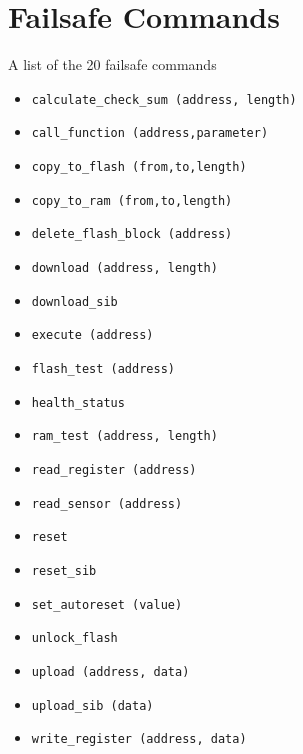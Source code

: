 \chapter{Failsafe Commands}
\label{appendix:B}
A list of the 20 failsafe commands
\begin{itemize}
	\item \texttt{calculate\_check\_sum (address, length)}
	\item \texttt{call\_function (address,parameter)}
	\item \texttt{copy\_to\_flash (from,to,length)}
	\item \texttt{copy\_to\_ram (from,to,length)}
	\item \texttt{delete\_flash\_block (address)}
	\item \texttt{download (address, length)}
	\item \texttt{download\_sib}
	\item \texttt{execute (address)}
	\item \texttt{flash\_test (address)}
	\item \texttt{health\_status}
	\item \texttt{ram\_test (address, length)}
	\item \texttt{read\_register (address)}
	\item \texttt{read\_sensor (address)}
	\item \texttt{reset}
	\item \texttt{reset\_sib}
	\item \texttt{set\_autoreset (value)}
	\item \texttt{unlock\_flash}
	\item \texttt{upload (address, data)}
	\item \texttt{upload\_sib (data)}
	\item \texttt{write\_register (address, data)}
\end{itemize}

